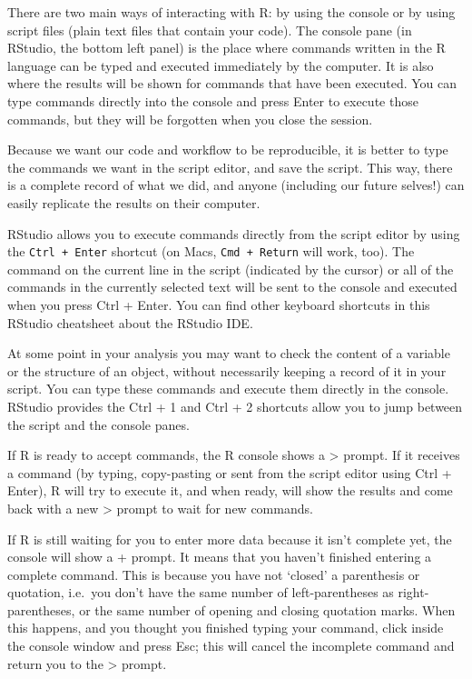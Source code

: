 \documentclass[]{book}
\begin{document}
There are two main ways of interacting with R: by using the console or by using script files (plain text files that contain your code). The console pane (in RStudio, the bottom left panel) is the place where commands written in the R language can be typed and executed immediately by the computer. It is also where the results will be shown for commands that have been executed. You can type commands directly into the console and press Enter to execute those commands, but they will be forgotten when you close the session.

Because we want our code and workflow to be reproducible, it is better to type the commands we want in the script editor, and save the script. This way, there is a complete record of what we did, and anyone (including our future selves!) can easily replicate the results on their computer.

RStudio allows you to execute commands directly from the script editor by using the \texttt{Ctrl\ +\ Enter} shortcut (on Macs, \texttt{Cmd\ +\ Return} will work, too). The command on the current line in the script (indicated by the cursor) or all of the commands in the currently selected text will be sent to the console and executed when you press Ctrl + Enter. You can find other keyboard shortcuts in this RStudio cheatsheet about the RStudio IDE.

At some point in your analysis you may want to check the content of a variable or the structure of an object, without necessarily keeping a record of it in your script. You can type these commands and execute them directly in the console. RStudio provides the Ctrl + 1 and Ctrl + 2 shortcuts allow you to jump between the script and the console panes.

If R is ready to accept commands, the R console shows a \textgreater{} prompt. If it receives a command (by typing, copy-pasting or sent from the script editor using Ctrl + Enter), R will try to execute it, and when ready, will show the results and come back with a new \textgreater{} prompt to wait for new commands.

If R is still waiting for you to enter more data because it isn't complete yet, the console will show a + prompt. It means that you haven't finished entering a complete command. This is because you have not `closed' a parenthesis or quotation, i.e.~you don't have the same number of left-parentheses as right-parentheses, or the same number of opening and closing quotation marks. When this happens, and you thought you finished typing your command, click inside the console window and press Esc; this will cancel the incomplete command and return you to the \textgreater{} prompt.
\end{document}

